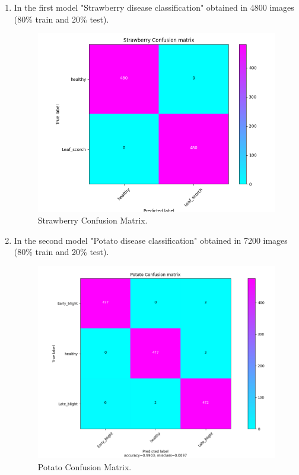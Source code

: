 \newpage
\begin{enumerate}
  \item In the first model "Strawberry disease classification" obtained in 4800 images (80\% train and 20\% test).
    \begin{figure}[H]
      \centering
      \includegraphics[width=11cm]{photos/chapter05/9.png}
      \caption{Strawberry Confusion Matrix.}
      \label{fig:strawberryConf}
    \end{figure}

  \item In the second model "Potato disease classification" obtained in 7200 images (80\% train and 20\% test).
    \begin{figure}[H]
      \centering
      \includegraphics[width=11cm]{photos/chapter05/10.png}
      \caption{Potato Confusion Matrix.}
    \end{figure}


\end{enumerate}
